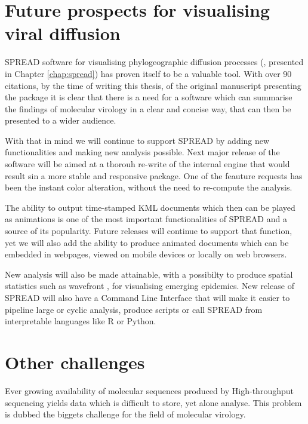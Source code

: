 \section{Future prospects for visualising viral diffusion}

SPREAD software for visualising phylogeographic diffusion processes (\citet{Bielejec2011}, presented in Chapter \ref{chap:spread}) has proven itself to be a valuable tool.
With over 90 citations, by the time of writing this thesis, of the original manuscript presenting the package it is clear that there is a need for a software which can summarise the findings of molecular virology in a clear and concise way, that can then be presented to a wider audience.

With that in mind we will continue to support SPREAD by adding new functionalities and making new analysis possible.
Next major release of the software will be aimed at a thorouh re-write of the internal engine that would result sin a more stable and responsive package.
One of the feauture requests has been the instant color alteration, without the need to re-compute the analysis.

The ability to output time-stamped KML documents which then can be played as animations is one of the most important functionalities of SPREAD and a source of its popularity.
Future releases will continue to support that function, yet we will also add the ability to produce animated documents which can be embedded in webpages, viewed on mobile devices or locally on web browsers.

New analysis will also be made attainable, with a possibilty to produce spatial statistics such as wavefront \citep{Pybus2012}, for visualising emerging epidemics.
New release of SPREAD will also have a Command Line Interface that will make it easier to pipeline large or cyclic analysis, produce scripts or call SPREAD from interpretable languages like R \citep{RCran} or Python.

\section{Other challenges}

Ever growing availability of molecular sequences produced by High-throughput sequencing yields data which is difficult to store, yet alone analyse.
This problem is dubbed the biggets challenge for the field of molecular virology.

